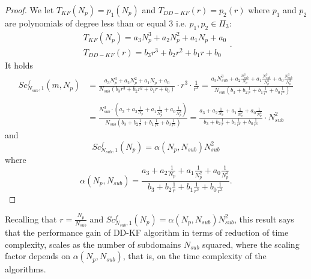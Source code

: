 \documentclass[smallcondensed]{svjour3}
\begin{document}
\begin{proof}
We let
$T_{KF}(N_p)=p_{1}(N_p)$ and  $T_{DD-KF}(r)=p_{2}(r)$ where $p_1$ and $p_2$ are polynomials of degree less than or equal 3 i.e. $p_{1},p_{2}\in \Pi_{3}$:
\begin{equation}
\begin{array}{ll}
T_{KF}(N_p)=a_{3}N_p^{3}+a_{2}N_p^{2}+a_{1}N_p+a_{0}\\
T_{DD-KF}(r)=b_{3}r^{3}+b_{2}r^{2}+b_{1}r+b_{0}
\end{array}.
\end{equation}
It holds
\begin{equation}
\begin{array}{ll}
Sc^f_{N_{sub},1}(m,N_p)&=\frac{a_{3}N_p^{3}+a_{2}N_p^{2}+a_{1}N_p+a_{0}}{N_{sub}(b_{3}r^{3}+b_{2}r^{2}+b_{1}r+b_{0})}\cdot r^{3}\cdot \frac{1}{r^{3}}=\frac{a_{3}N_{sub}^{3}+a_{2}\frac{n_{sub}^{3}}{N_p}+a_{1}\frac{N_{sub}^{3}}{N_p^{2}}+a_{0}\frac{N_{sub}^{3}}{N_p^{3}}}{N_{sub}(b_{3}+b_{2}\frac{1}{r}+b_{1}\frac{1}{r^{2}}+b_{0}\frac{1}{r^{3}})}\\
\\
&=\frac{N_{sub}^{3}\cdot(a_{3}+a_{2}\frac{1}{N_p}+a_{1}\frac{1}{N_p^{2}}+a_{0}\frac{1}{N_p^{3}})}{N_{sub}(b_{3}+b_{2}\frac{1}{r}+b_{1}\frac{1}{r^{2}}+b_{0}\frac{1}{r^{3}})}=\frac{a_{3}+a_{2}\frac{1}{N_p}+a_{1}\frac{1}{N_p^{2}}+a_{0}\frac{1}{N_p^{3}}}{b_{3}+b_{2}\frac{1}{r}+b_{1}\frac{1}{r^{2}}+b_{0}\frac{1}{r^{3}}}\cdot N_{sub}^{2}
\end{array}
\end{equation}
and 
\begin{equation*}
Sc^f_{N_{sub},1}(N_p)=\alpha(N_p,N_{sub})N_{sub}^{2}
\end{equation*} 
where
\begin{equation}
\alpha(N_p,N_{sub})=\frac{a_{3}+a_{2}\frac{1}{N_p}+a_{1}\frac{1}{N_p^{2}}+a_{0}\frac{1}{N_p^{3}}}{b_{3}+b_{2}\frac{1}{r}+b_{1}\frac{1}{r^{2}}+b_{0}\frac{1}{r^{3}}}.
\end{equation}
\end{proof}


\noindent Recalling that $r=\frac{N
_p}{N_{sub}}$ and $Sc^f_{N_{sub},1}(N_p)=\alpha(N_p,N_{sub})N_{sub}^{2}$, this result says that
the performance gain of DD-KF algorithm in terms of  reduction of time complexity, scales as the number of subdomains $N_{sub}$ squared, where the scaling factor depends on  $\alpha(N_p,N_{sub})$, that is,  on the time complexity of the algorithms.
\end{document}
